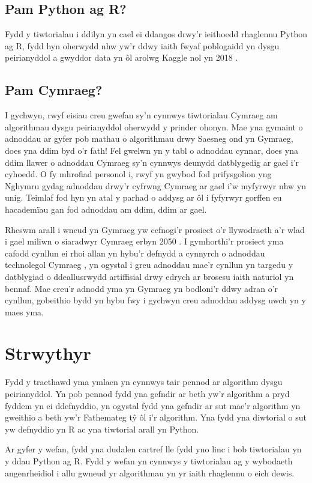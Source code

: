 \subsection{Pam Python ag R?}

Fydd y tiwtorialau i ddilyn yn cael ei ddangos drwy'r ieithoedd rhaglennu Python ag R, fydd hyn oherwydd nhw yw'r ddwy iaith fwyaf poblogaidd yn dysgu peirianyddol a gwyddor data yn \^{o}l arolwg Kaggle nol yn 2018 \cite{kagglesurvey}.

\subsection{Pam Cymraeg?}

I gychwyn, rwyf eisiau creu gwefan sy'n cynnwys tiwtorialau Cymraeg am algorithmau dysgu peirianyddol oherwydd y prinder ohonyn. Mae yna gymaint o adnoddau ar gyfer pob mathau o algorithmau drwy Saesneg ond yn Gymraeg, does yna ddim byd o'r fath! Fel gwelwn yn y tabl o adnoddau cynnar, does yna ddim llawer o adnoddau Cymraeg sy'n cynnwys deunydd datblygedig ar gael i'r cyhoedd. O fy mhrofiad personol i, rwyf yn gwybod fod prifysgolion yng Nghymru gydag adnoddau drwy'r cyfrwng Cymraeg ar gael i'w myfyrwyr nhw yn unig. Teimlaf fod hyn yn atal y parhad o addysg ar \^{o}l i fyfyrwyr gorffen eu hacadem\"{i}au gan fod adnoddau am ddim, ddim ar gael.  

Rheswm arall i wneud yn Gymraeg yw cefnogi'r prosiect o'r llywodraeth a'r wlad i gael miliwn o siaradwyr Cymraeg erbyn 2050 \cite{cymraeg2050}. I gymhorthi'r prosiect yma cafodd cynllun ei rhoi allan yn hybu'r defnydd a cynnyrch o adnoddau technolegol Cymraeg \cite{cymraeg2050tech}, yn ogystal i greu adnoddau mae'r cynllun yn targedu y datblygiad o ddeallusrwydd artiffisial drwy edrych ar brosesu iaith naturiol yn bennaf. Mae creu'r adnodd yma yn Gymraeg yn bodloni'r ddwy adran o'r cynllun, gobeithio bydd yn hybu fwy i gychwyn creu adnoddau addysg uwch yn y maes yma. 

\section{Strwythyr}

Fydd y traethawd yma ymlaen yn cynnwys tair pennod ar algorithm dysgu peirianyddol. Yn pob pennod fydd yna gefndir ar beth yw'r algorithm a pryd fyddem yn ei ddefnyddio, yn ogystal fydd yna gefndir ar sut mae'r algorithm yn gweithio a beth yw'r Fathemateg t\^{y} \^{o}l i'r algorithm. Yna fydd yna diwtorial o sut yw defnyddio yn R ac yna tiwtorial arall yn Python.

Ar gyfer y wefan, fydd yna dudalen cartref lle fydd yno linc i bob tiwtorialau yn y ddau Python ag R. Fydd y wefan yn cynnwys y tiwtorialau ag y wybodaeth angenrheidiol i allu gwneud yr algorithmau yn yr iaith rhaglennu o eich dewis.

